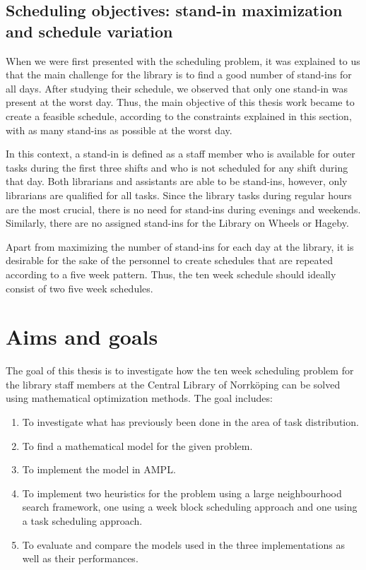 \subsection{Scheduling objectives: stand-in maximization and schedule variation}

When we were first presented with the scheduling problem, it was explained to us that the main challenge for the library is to find a good number of stand-ins for all days. After studying their schedule, we observed that only one stand-in was present at the worst day. Thus, the main objective of this thesis work became to create a feasible schedule, according to the constraints explained in this section, with as many stand-ins as possible at the worst day.

In this context, a stand-in is defined as a staff member who is available for outer tasks during the first three shifts and who is not scheduled for any shift during that day. Both librarians and assistants are able to be stand-ins, however, only librarians are qualified for all tasks. Since the library tasks during regular hours are the most crucial, there is no need for stand-ins during evenings and weekends. Similarly, there are no assigned stand-ins for the Library on Wheels or Hageby.

Apart from maximizing the number of stand-ins for each day at the library, it is desirable for the sake of the personnel to create schedules that are repeated according to a five week pattern. Thus, the ten week schedule should ideally consist of two five week schedules.

\section{Aims and goals}

The goal of this thesis is to investigate how the ten week scheduling problem for the library staff members at the Central Library of Norrköping can be solved using mathematical optimization methods. The goal includes:

\begin{enumerate}
\item To investigate what has previously been done in the area of task distribution.
\item To find a mathematical model for the given problem.
\item To implement the model in AMPL.
\item To implement two heuristics for the problem using a large neighbourhood search framework, one using a week block scheduling approach and one using a task scheduling approach.
\item To evaluate and compare the models used in the three implementations as well as their performances.
\end{enumerate}


